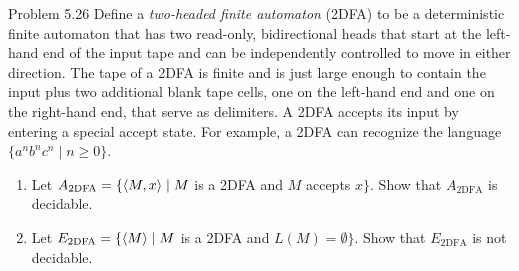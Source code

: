 \begin{question}{Problem 5.26}
Define a \emph{two-headed finite automaton} (2DFA) to be a deterministic finite automaton that has two read-only, bidirectional heads that start at the left-hand end of the input tape and can be independently controlled to move in either direction. The tape of a 2DFA is finite and is just large enough to contain the input plus two additional blank tape cells, one on the left-hand end and one on the right-hand end, that serve as delimiters. A 2DFA accepts its input by entering a special accept state. For example, a 2DFA can recognize the language $\{a^nb^nc^n\mid n\ge 0\}$.
\begin{enumerate}[label=\alph*.]
\item Let $A_{\mathrm{2DFA}}=\{\langle M,x\rangle\mid M$ is a 2DFA and $M$ accepts $x\}$.
Show that $A_{\mathrm{2DFA}}$ is decidable.
\item Let $E_{\mathrm{2DFA}}=\{\langle M\rangle\mid M$ is a 2DFA and $L(M)=\emptyset\}$.
Show that $E_{\mathrm{2DFA}}$ is not decidable.
\end{enumerate}
\end{question}
